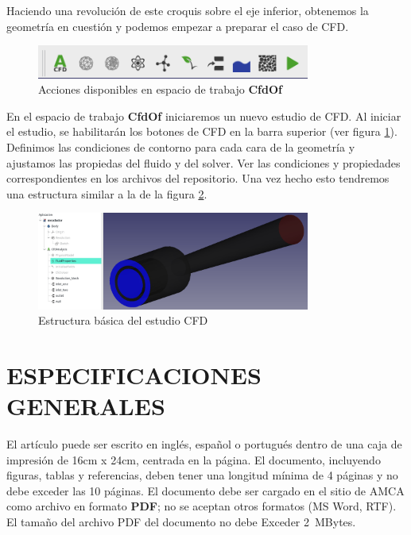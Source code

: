 \documentclass[oneside,a4paper,spanish,links]{amca}
\begin{document}
Haciendo una revolución de este croquis sobre el eje inferior, obtenemos la geometría en cuestión y podemos empezar a preparar el caso de CFD.

\begin{figure}[htb]
	\centerline{\includegraphics[width=0.8\textwidth]{Figuras/02_BOTONES_CFD.png}} \caption{Acciones disponibles en espacio de trabajo \textbf{CfdOf}} \label{fg:botones_cfd}
\end{figure}

En el espacio de trabajo \textbf{CfdOf} iniciaremos un nuevo estudio de CFD. Al iniciar el estudio, se habilitarán los botones de CFD en la barra superior (ver figura \ref{fg:botones_cfd}). Definimos las condiciones de contorno para cada cara de la geometría y ajustamos las propiedas del fluido y del solver. Ver las condiciones y propiedades correspondientes en los archivos del repositorio. Una vez hecho esto tendremos una estructura similar a la de la figura \ref{fg:estructura_freecad}.
	
	


\begin{figure}[htb]
	\centerline{\includegraphics[width=0.8\textwidth]{Figuras/02_ESTRUCTURA_FREECAD.png}} \caption{Estructura básica del estudio CFD} \label{fg:estructura_freecad}
\end{figure}


\section{ESPECIFICACIONES GENERALES}

El artículo puede ser escrito en inglés, español o portugués
dentro de una caja de impresión de 16cm x 24cm, centrada en la
página. El documento, incluyendo figuras, tablas y referencias,
deben tener una longitud mínima de 4 páginas y no debe exceder las
10 páginas. El documento debe ser cargado en el sitio de AMCA como
archivo en formato \textbf {PDF}; no se aceptan otros formatos (MS
Word, RTF). El tamaño del archivo PDF del documento no debe
Exceder 2~MBytes.
\end{document}
